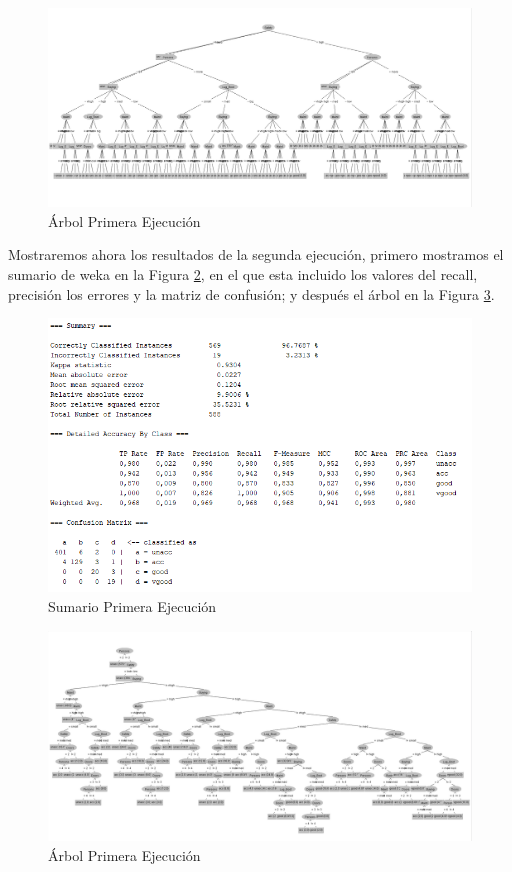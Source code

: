 \documentclass[a4paper, 11pt, twoside, openany, onecolumn, final]{memoir}
\begin{document}
	\begin{figure}
  		\centering
   		\includegraphics[width=1\textwidth]{Imagenes/ArbolSinEntreNiVal}
  		\caption{Árbol Primera Ejecución}
  		\label{ArbolPrimeraEjecucion}
	\end{figure}
	
	Mostraremos ahora los resultados de la segunda ejecución, primero mostramos el sumario de weka en la Figura \ref{SumarioSegundaEjecucion}, en el que esta incluido los valores del recall, precisión los errores y la matriz de confusión; y después el árbol en la Figura \ref{ArbolSegundaEjecucion}.
	\begin{figure}
  		\centering
   		\includegraphics{Imagenes/SummaryConEntreYValYBinarySplit}
  		\caption{Sumario Primera Ejecución}
  		\label{SumarioSegundaEjecucion}
	\end{figure}	
	
	\begin{figure}
  		\centering
   		\includegraphics[width=1\textwidth]{Imagenes/ArbolConEntreYValYBinarySplit}
  		\caption{Árbol Primera Ejecución}
  		\label{ArbolSegundaEjecucion}
	\end{figure}
	
\end{document}
